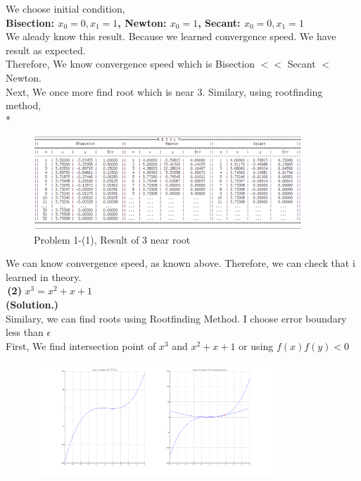 \documentclass[10pt]{article}
\begin{document}
\begin{flushleft}
\begin{figure}[!h]
\begin{center}
		\end{center}
	\end{figure}
	\qquad \quad We choose initial condition,\\
	\qquad \qquad \qquad \qquad \qquad \textbf{Bisection: $x_0=0,x_1=1$, Newton: $x_0=1$, Secant: $x_0=0,x_1=1$}\\
	\qquad \quad We aleady know this result. Because we learned convergence speed. We have result as expected.\\
	\qquad \quad Therefore, We know convergence speed which is Bisection $<<$ Secant $ < $ Newton.\\
	\qquad \quad Next, We once more find root which is near 3. Similary, using rootfinding method,\\*
	\begin{figure}[!h]
		\centering
		\begin{center}
		\includegraphics[width=0.9\textwidth]{1-1-r2.png}
		\caption{Problem 1-(1), Result of 3 near root }
		\end{center}
	\end{figure}
	\qquad \quad We can know convergence speed, as known above. Therefore, we can check that i learned in theory.\\
	\;
	\quad\,\textbf{(2)} $x^3=x^2+x+1$\\
	\;\;\;
	\qquad \quad \textbf{(Solution.)} \\
	\qquad \quad Similary, we can find roots using Rootfinding Method. I choose error boundary less than $\epsilon$\\ 
	\qquad \quad First, We find intersection point of $x^3$ and $x^2+x+1$ or using $f(x)f(y)<0$\\
	\begin{figure}[!h]
		\centering
		\begin{center}
		\includegraphics[width=0.8\textwidth]{1-1-2.png}

\end{center}
\end{figure}
\end{flushleft}
\end{document}
